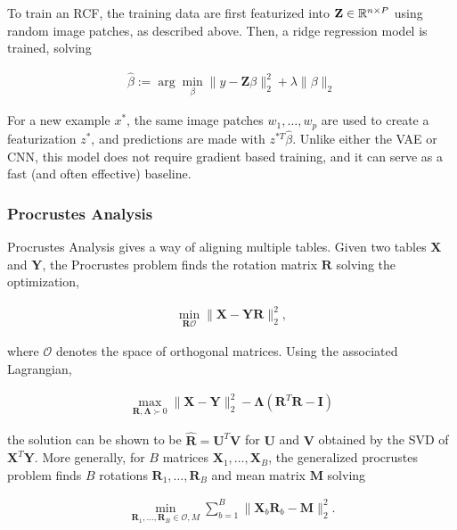 To train an RCF, the training data are first featurized into $\mathbf{Z} \in
\mathbb{R}^{n \times P}$ using random image patches, as described above. Then, a
ridge regression model is trained, solving

\begin{align*}
\hat{\beta} := \arg \min_{\beta} \|y - \mathbf{Z}\beta\|_{2}^{2} + \lambda \|\beta\|_{2}
\end{align*}

For a new example $x^{\ast}$, the same image patches $w_{1}, \dots, w_{p}$ are used to create a featurization $z^{\ast}$, and predictions are made with $z^{\ast T}\hat{\beta}$. Unlike either the VAE or CNN, this model does not require gradient based training, and it can serve as a fast (and often effective) baseline.

\subsubsection{Procrustes Analysis}
Procrustes Analysis gives a way of aligning multiple tables. Given two tables $\mathbf{X}$ and $\mathbf{Y}$, the Procrustes problem finds the rotation matrix $\mathbf{R}$ solving the optimization,

\begin{align*}
\min_{\mathbf{R} \mathcal{O}} \|\mathbf{X} - \mathbf{Y}\mathbf{R}\|^{2}_{2},
\end{align*}

where $\mathcal{O}$ denotes the space of orthogonal matrices. Using the associated Lagrangian,

\begin{align*}
\max_{\mathbf{R}, \mathbf{\Lambda} \succ 0} \|\mathbf{X} - \mathbf{Y}\|_{2}^{2} - \mathbf{\Lambda}\left(\mathbf{R}^{T}\mathbf{R} - \mathbf{I}\right)
\end{align*}

the solution can be shown to be $\hat{\mathbf{R}} = \mathbf{U}^{T}\mathbf{V}$ for $\mathbf{U}$ and $\mathbf{V}$ obtained by the SVD of $\mathbf{X}^{T}\mathbf{Y}$. More generally, for $B$ matrices $\mathbf{X}_{1}, \dots, \mathbf{X}_{B}$, the generalized procrustes problem finds $B$ rotations $\mathbf{R}_{1}, \dots, \mathbf{R}_{B}$ and mean matrix $\mathbf{M}$ solving

\begin{align*}
\min_{\mathbf{R}_{1}, \dots, \mathbf{R}_{B} \in \mathcal{O}, M} \sum_{b = 1}^{B} \|\mathbf{X}_{b}\mathbf{R}_{b} - \mathbf{M}\|_{2}^{2}.
\end{align*}

